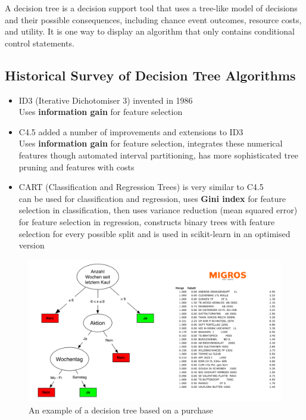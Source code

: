 \documentclass[11pt]{article}
\begin{document}
A decision tree is a decision support tool that uses a tree-like model of decisions and their possible consequences, including chance event outcomes, resource costs, and utility. It is one way to display an algorithm that only contains conditional control statements. 

\subsection{Historical Survey of Decision Tree Algorithms}

\begin{itemize}
    \item ID3 (Iterative Dichotomiser 3) invented in 1986\\
    Uses \textbf{information gain} for feature selection
    \item C4.5 added a number of improvements and extensions to ID3\\
    Uses \textbf{information gain} for feature selection, integrates these numerical features though automated interval partitioning, has more sophisticated tree pruning and features with costs
    \item CART (Classification and Regression Trees) is very similar to C4.5\\
    can be used for classification and regression, uses \textbf{Gini index} for feature selection in classification, then uses variance reduction (mean squared error) for feature selection in regression, constructs binary trees with feature selection for every possible split and is used in scikit-learn in an optimised version
\end{itemize}

\begin{figure}[tbh!]
    \centering
    \includegraphics[width=0.7\linewidth, keepaspectratio]{Pictures/decision_tree_example}
    \caption{An example of a decision tree based on a purchase}
    \label{fig:decisiontreeexample}
\end{figure}
\end{document}
